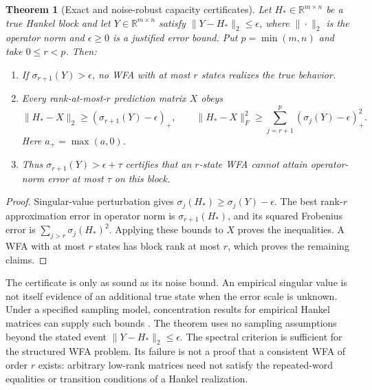 \documentclass[11pt]{article}
\newtheorem{theorem}{Theorem}[section]
\theoremstyle{definition}
\theoremstyle{remark}
\begin{document}
\begin{theorem}[Exact and noise-robust capacity certificates]
\label{ce:certificate}
Let $H_*\in\mathbb R^{m\times n}$ be a true Hankel block and let
$Y\in\mathbb R^{m\times n}$ satisfy
$\|Y-H_*\|_2\leq\epsilon$, where $\|\cdot\|_2$ is the operator norm and
$\epsilon\geq0$ is a justified error bound. Put $p=\min(m,n)$ and take
$0\leq r<p$. Then:
\begin{enumerate}
\item If $\sigma_{r+1}(Y)>\epsilon$, no WFA with at most $r$ states
      realizes the true behavior.
\item Every rank-at-most-$r$ prediction matrix $X$ obeys
\[
 \|H_*-X\|_2\geq(\sigma_{r+1}(Y)-\epsilon)_+,
 \qquad
 \|H_*-X\|_F^2\geq
 \sum_{j=r+1}^{p}(\sigma_j(Y)-\epsilon)_+^2.
\]
Here $a_+=\max(a,0)$.
\item Thus $\sigma_{r+1}(Y)>\epsilon+\tau$ certifies that an $r$-state
      WFA cannot attain operator-norm error at most $\tau$ on this block.
\end{enumerate}
\end{theorem}
\begin{proof}
Singular-value perturbation gives
$\sigma_j(H_*)\geq\sigma_j(Y)-\epsilon$. The best rank-$r$
approximation error in operator norm is $\sigma_{r+1}(H_*)$, and its
squared Frobenius error is $\sum_{j>r}\sigma_j(H_*)^2$. Applying these
bounds to $X$ proves the inequalities. A WFA with at most $r$ states has
block rank at most $r$, which proves the remaining claims.
\end{proof}

The certificate is only as sound as its noise bound. An empirical singular
value is not itself evidence of an additional true state when the error scale
is unknown. Under a specified sampling model, concentration results for
empirical Hankel matrices can supply such bounds
\cite{ce:denis2016}. The theorem uses no sampling assumptions beyond the
stated event $\|Y-H_*\|_2\leq\epsilon$.
The spectral criterion is sufficient for the structured WFA problem. Its
failure is not a proof that a consistent WFA of order $r$ exists: arbitrary
low-rank matrices need not satisfy the repeated-word equalities or transition
conditions of a Hankel realization.
\end{document}
